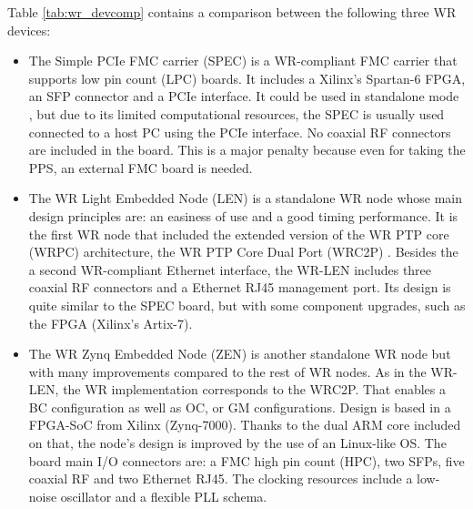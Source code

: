 Table \ref{tab:wr_devcomp} contains a comparison between the following three WR
devices: \begin{itemize} \item The Simple PCIe FMC carrier (SPEC)
			\cite{ohwr:spec} is a WR-compliant FMC carrier that
			supports low pin count (LPC) boards. It includes a
			Xilinx's Spartan-6 FPGA, an SFP connector and a PCIe
			interface. It could be used in standalone mode
			\cite{migueljl-paper-wr-spec}, but due to its limited
			computational resources, the SPEC is usually used
			connected to a host PC using the PCIe interface.  No
			coaxial RF connectors are included in the board. This is
			a major penalty because even for taking the PPS, an
			external FMC board is needed.
	
	\item The WR Light Embedded Node (LEN) \cite{sevensols:wr_len} is a
		standalone WR node whose main design principles are: an easiness
		of use and a good timing performance. It is the first WR node
		that included the extended version of the WR PTP core (WRPC)
		architecture, the WR PTP Core Dual Port (WRC2P)
		\cite{torres2016scalability}. Besides the a second WR-compliant
		Ethernet interface, the WR-LEN includes three coaxial RF
		connectors and a Ethernet RJ45 management port. Its design is
		quite similar to the SPEC board, but with some component
		upgrades, such as the FPGA (Xilinx's Artix-7).
	
	\item The WR Zynq Embedded Node (ZEN) \cite{sevensols:wr_zen} is another
		standalone WR node but with many improvements compared to the
		rest of WR nodes. As in the WR-LEN, the WR implementation
		corresponds to the WRC2P.  That enables a BC configuration as
		well as OC, or GM configurations. Design is based in a FPGA-SoC
		from Xilinx (Zynq-7000). Thanks to the dual ARM core included on
		that, the node's design is improved by the use of an Linux-like
		OS. The board main I/O connectors are: a FMC high pin count
		(HPC), two SFPs, five coaxial RF and two Ethernet RJ45. The
clocking resources include a low-noise oscillator and a flexible PLL schema.
\end{itemize}

